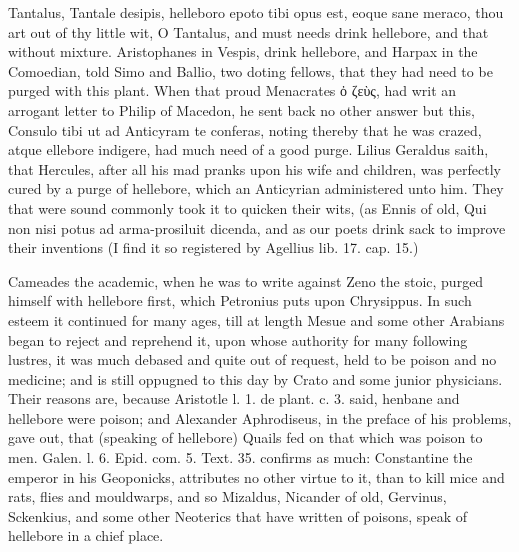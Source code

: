 {Tantalus, Tantale desipis, helleboro epoto tibi opus est, eoque sane
meraco, thou art out of thy little wit, O Tantalus, and must needs
drink hellebore, and that without mixture. Aristophanes in Vespis,
drink hellebore, \etc{} and Harpax in the  Comoedian, told Simo and
Ballio, two doting fellows, that they had need to be purged with this
plant. When that proud Menacrates \textgreek{ὀ ζεὺς}, had writ an arrogant letter
to Philip of Macedon, he sent back no other answer but this, Consulo
tibi ut ad Anticyram te conferas, noting thereby that he was crazed,
atque ellebore indigere, had much need of a good purge. Lilius Geraldus
saith, that Hercules, after all his mad pranks upon his wife and
children, was perfectly cured by a purge of hellebore, which an
Anticyrian administered unto him. They that were sound commonly took it
to quicken their wits, (as Ennis of old, Qui non nisi potus ad
arma-prosiluit dicenda, and as our poets drink sack to improve their
inventions (I find it so registered by Agellius lib. 17. cap. 15.)

Cameades the academic, when he was to write against Zeno the stoic,
purged himself with hellebore first, which Petronius puts upon
Chrysippus. In such esteem it continued for many ages, till at length
Mesue and some other Arabians began to reject and reprehend it, upon
whose authority for many following lustres, it was much debased and
quite out of request, held to be poison and no medicine; and is still
oppugned to this day by  Crato and some junior physicians. Their
reasons are, because Aristotle l. 1. de plant. c. 3. said, henbane and
hellebore were poison; and Alexander Aphrodiseus, in the preface of his
problems, gave out, that (speaking of hellebore) Quails fed on
that which was poison to men. Galen. l. 6. Epid. com. 5. Text. 35.
confirms as much: Constantine the emperor in his Geoponicks,
attributes no other virtue to it, than to kill mice and rats, flies and
mouldwarps, and so Mizaldus, Nicander of old, Gervinus, Sckenkius, and
some other Neoterics that have written of poisons, speak of hellebore
in a chief place. 

}
